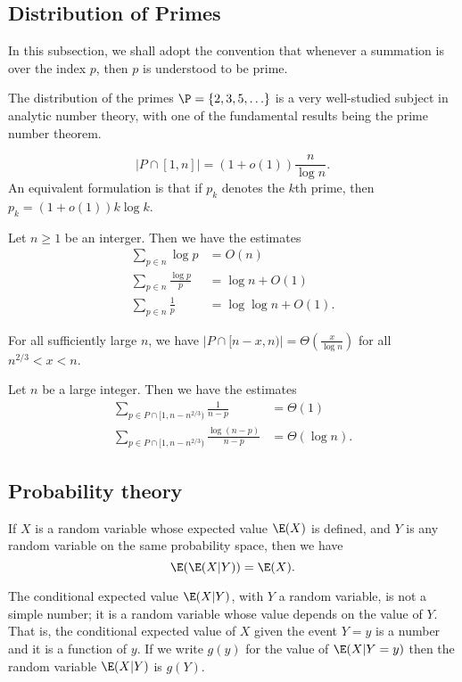 \subsection{Distribution of Primes}
In this subsection, we shall adopt the convention that whenever a summation is over the index $p$, then $p$ is understood to be prime.


The distribution of the primes $\P=\{2,3,5,\ldots\}$ is a very well-studied subject in analytic number theory, with one of the fundamental results being the prime number theorem.

\begin{thm}
\[
    |P\cap[1,n]|=(1+o(1))\frac{n}{\log n}.
\]
An equivalent formulation is that if $p_k$ denotes the $k$th prime, then $p_k = (1 +o(1))k \log k$.
\end{thm}

\begin{prop}\label{prop:Elementary-prime-number-estimates}
Let $n\geq 1$ be an interger. Then we have the estimates
\begin{align}
\sum_{p\in n}\log p &= O(n)\\
\sum_{p\in n}\frac{\log p}{p} &= \log n+O(1)\\
\sum_{p\in n}\frac{1}{p} &= \log\log n+O(1).
\end{align}
\end{prop}

\begin{thm}\label{thm:the-distribution-of-primes-in-intervals}
For all sufficiently large $n$, we have $|P\cap [n-x,n)|= \Theta( \frac{x}{\log n})$ for all $n^{2/3}<x<n$.
\end{thm}

\begin{prop}\label{prop:Elementary-prime-number-estimates-in-intervals}
Let $n$ be a large integer. Then we have the estimates 
\begin{align}
\sum_{p\in P\cap[1,n-n^{2/3})}\frac{1}{n-p}&=\Theta(1)\\
\sum_{p\in P\cap[1,n-n^{2/3})}\frac{\log(n-p)}{n-p}&=\Theta(\log n).
\end{align}

\subsection{Probability theory}
\begin{lem}\label{lem:Law-of-total-expectation}
If $X$ is a random variable whose expected value $\E(X)$ is defined, and $Y$ is any random variable on the same probability space, then we have
\[
\E(\E(X|Y))=\E(X).
\]
\end{lem}
\begin{tcolorbox}[pikachu]
The conditional expected value $\E(X | Y)$, with $Y$ a random variable, is not a simple number; it is a random variable whose value depends on the value of $Y$. That is, the conditional expected value of $X$ given the event $Y = y$ is a number and it is a function of $y$. If we write $g(y)$ for the value of $\E(X | Y = y)$ then the random variable $\E(X | Y)$ is $g(Y)$.    
\end{tcolorbox}
\end{prop}